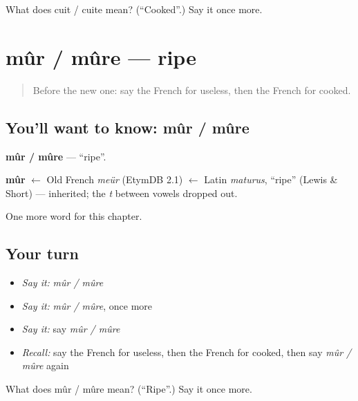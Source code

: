 \begin{tcolorbox}[breakable,colback=teal!4,colframe=teal!35!black,title={Before you move on}]
What does cuit / cuite mean? (\textquotedblleft{}Cooked\textquotedblright{}.) Say it once more.
\end{tcolorbox}
\section[mûr / mûre]{mûr / mûre — ripe}

\label{lesson:FR-C192-mur-mure}



\begin{quote}
Before the new one: say the French for useless, then the French for cooked.
\end{quote}

\subsection*{You'll want to know: mûr / mûre}
\textbf{mûr / mûre} — \textquotedblleft{}ripe\textquotedblright{}.

\begin{cousinweb}
\textbf{mûr} $\leftarrow$ Old French \emph{meür} (EtymDB 2.1) $\leftarrow$ Latin \emph{maturus}, \textquotedblleft{}ripe\textquotedblright{} (Lewis \& Short) — inherited; the \emph{t} between vowels dropped out.
\end{cousinweb}

\begin{grammarlens}[title={What you've built}]
One more word for this chapter.
\end{grammarlens}

\subsection*{Your turn}
\begin{itemize}
\raggedright
  \item \emph{Say it:} \emph{mûr / mûre}
  \item \emph{Say it:} \emph{mûr / mûre}, once more
  \item \emph{Say it:} say \emph{mûr / mûre}
  \item \emph{Recall:} say the French for useless, then the French for cooked, then say \emph{mûr / mûre} again
\end{itemize}

\begin{tcolorbox}[breakable,colback=teal!4,colframe=teal!35!black,title={Before you move on}]
What does mûr / mûre mean? (\textquotedblleft{}Ripe\textquotedblright{}.) Say it once more.
\end{tcolorbox}
